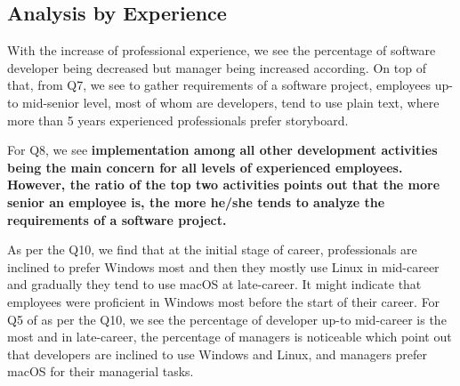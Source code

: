 \subsection{Analysis by Experience}\label{analyze_by_experience}


%
%

With the increase of professional experience, we see the percentage of software
developer being decreased but manager being increased according. On top of that, from Q7, we see
to gather requirements of a software project, employees up-to mid-senior level,
most of whom are developers, tend to use plain text, where more than 5 years
experienced professionals prefer storyboard.

For Q8, we see
\bf{implementation among all other development activities being the main concern for
all levels of experienced employees. However, the ratio of the top two
activities points out that the more senior an employee is, the more he/she tends
to analyze the requirements of a software project.}

As per the Q10, we find that at the initial stage of career, professionals are inclined to prefer Windows most and then they mostly use Linux in mid-career and gradually they tend to use macOS at late-career. It might indicate that employees were proficient in Windows most before the start of their career. For Q5 of as per the Q10, we see the percentage of developer up-to mid-career is the most and in late-career, the percentage of managers is noticeable which point out that developers are inclined to use Windows and Linux, and managers prefer macOS for their managerial tasks.

